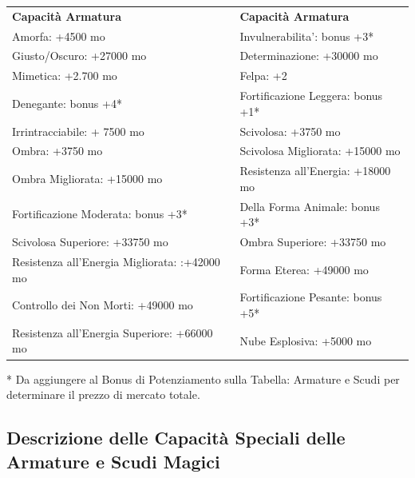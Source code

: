 \documentclass[a4paper,11pt,twoside,openany]{book}
\begin{document}
\begin{tabular}{ll}
	\toprule
	\textbf{Capacità Armatura}                                                             & \textbf{Capacità Armatura}\tabularnewline
	Amorfa:\index{Amorfa} +4500 mo                                                         & Invulnerabilita'\index{Invulnerabilita'}: bonus +3{*}\tabularnewline
	Giusto/Oscuro:\index{Giusto/Oscuro:} +27000 mo                                         & Determinazione\index{Determinazione}: +30000 mo\tabularnewline
	Mimetica: \index{Mimetica}+2.700 mo                                                    & Felpa\index{Felpa}: +2\tabularnewline
	Denegante:\index{Denegante} bonus +4{*}                                                & Fortificazione Leggera\index{Fortificazione Leggera}: bonus +1{*}\tabularnewline
	Irrintracciabile:\index{Irrintracciabile} + 7500 mo                                    & Scivolosa\index{Scivolosa}: +3750 mo\tabularnewline
	Ombra: \index{Ombra}+3750 mo                                                           & Scivolosa Migliorata\index{Scivolosa Migliorata}: +15000 mo\tabularnewline
	Ombra Migliorata:\index{Ombra Migliorata} +15000 mo                                    & Resistenza all'Energia: \index{Resistenza all'Energia}+18000 mo\tabularnewline
	Fortificazione Moderata: \index{Fortificazione Moderata}bonus +3{*}                    & Della Forma Animale\index{Della Forma Animale}: bonus +3{*}\tabularnewline
	Scivolosa Superiore:\index{Scivolosa Superiore} +33750 mo                              & Ombra Superiore: \index{Ombra Superiore}+33750 mo\tabularnewline
	Resistenza all'Energia Migliorata: \index{Resistenza all'Energia Migliorata}:+42000 mo & Forma Eterea\index{Forma Eterea}: +49000 mo\tabularnewline
	Controllo dei Non Morti:\index{Controllo dei Non Morti} +49000 mo                      & Fortificazione Pesante:\index{Fortificazione Pesante} bonus +5{*}\tabularnewline
	Resistenza all'Energia Superiore\index{Resistenza all'Energia Superiore}: +66000 mo    & Nube Esplosiva\index{Nube Esplosiva}: +5000 mo\tabularnewline
\end{tabular}

{*} Da aggiungere al Bonus di Potenziamento sulla Tabella: Armature
e Scudi per determinare il prezzo di mercato totale.



\subsection{Descrizione delle Capacità Speciali delle Armature e Scudi Magici}
\end{document}
